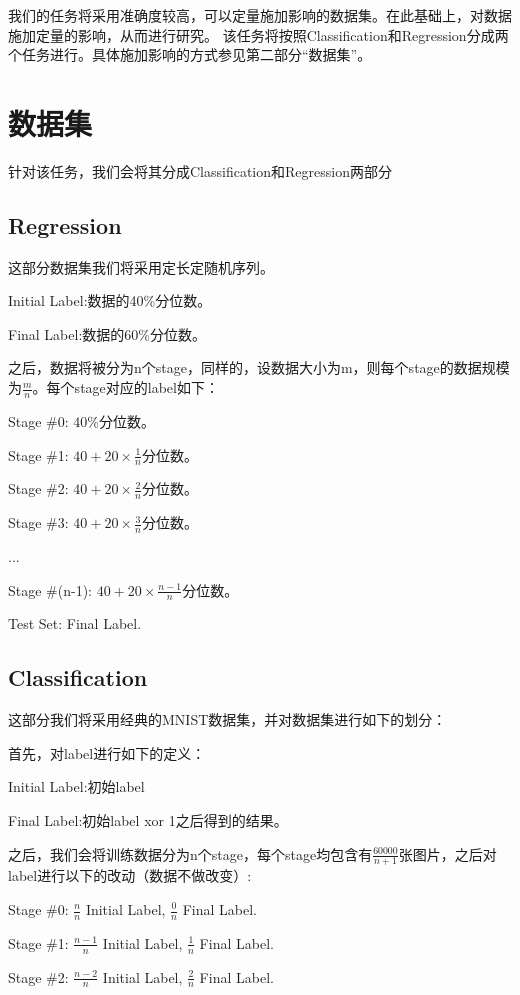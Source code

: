 \documentclass{article}
\begin{document}
我们的任务将采用准确度较高，可以定量施加影响的数据集。在此基础上，对数据施加定量的影响，从而进行研究。
该任务将按照Classification和Regression分成两个任务进行。具体施加影响的方式参见第二部分“数据集”。

\section{数据集}

针对该任务，我们会将其分成Classification和Regression两部分

\subsection{Regression}
这部分数据集我们将采用定长定随机序列。

Initial Label:数据的40\%分位数。

Final Label:数据的60\%分位数。

之后，数据将被分为n个stage，同样的，设数据大小为m，则每个stage的数据规模为$\frac{m}{n}$。每个stage对应的label如下：

Stage \#0: $40$\%分位数。

Stage \#1: $40+20\times \frac{1}{n}$分位数。

Stage \#2: $40+20 \times \frac{2}{n}$分位数。

Stage \#3: $40+20 \times \frac{3}{n}$分位数。

...

Stage \#(n-1): $40+20 \times \frac{n-1}{n}$分位数。

Test Set: Final Label.

\subsection{Classification}
这部分我们将采用经典的MNIST数据集，并对数据集进行如下的划分：

首先，对label进行如下的定义：

Initial Label:初始label

Final Label:初始label xor 1之后得到的结果。

之后，我们会将训练数据分为n个stage，每个stage均包含有$\frac{60000}{n+1}$张图片，之后对label进行以下的改动（数据不做改变）:

Stage \#0: $\frac{n}{n}$ Initial Label, $\frac{0}{n}$ Final Label.

Stage \#1: $\frac{n-1}{n}$ Initial Label, $\frac{1}{n}$ Final Label.

Stage \#2: $\frac{n-2}{n}$ Initial Label, $\frac{2}{n}$ Final Label.
\end{document}
